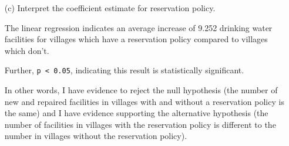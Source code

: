 \documentclass[12pt,letterpaper]{article}
\begin{document}
\begin{enumerate}
	\vspace{6cm}
	\item [(c)] Interpret the coefficient estimate for reservation policy. 
	
	\noindent The linear regression indicates an average increase of 9.252 drinking water facilities for villages which have a reservation policy compared to villages which don't.
	
	\noindent Further, \texttt{p < 0.05}, indicating this result is statistically significant.
	
	\noindent In other words, I have evidence to reject the null hypothesis (the number of new and repaired facilities in villages with and without a reservation policy is the same) and I have evidence supporting the alternative hypothesis (the number of facilities in villages with the reservation policy is different to the number in villages without the reservation policy).
	
\end{enumerate}
\end{document}
